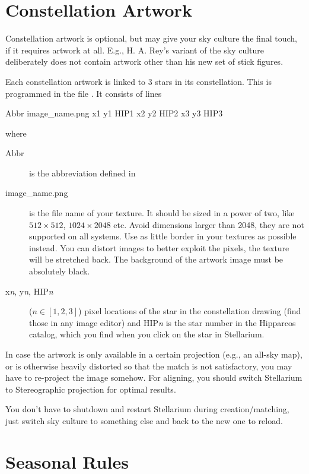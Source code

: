 \section{Constellation Artwork}
\label{sec:skycultures:artwork}

Constellation artwork is optional, but may give your sky culture the
final touch, if it requires artwork at all. E.g., H. A. Rey's variant
of the  sky culture deliberately does not contain artwork
other than his new set of stick figures.

Each constellation artwork is linked to 3 stars in its constellation. This
is programmed in the file . It consists of lines

\begin{configfile}
  Abbr image_name.png x1 y1 HIP1 x2 y2 HIP2 x3 y3 HIP3
\end{configfile}
where 
\begin{description}
\item[Abbr] is the abbreviation defined in 
\item[image\_name.png] is the file name of your texture. It should be
  sized in a power of two, like $512\times512$, $1024\times2048$
  etc. Avoid dimensions larger than 2048, they are not supported on
  all systems. Use as little border in your textures as possible instead.
  You can distort images to better exploit the pixels,
  the texture will be stretched back. The background of the artwork
  image must be absolutely black.
\item[x\textit{n}, y\textit{n}, HIP\textit{n}] ($n\in[1, 2, 3]$) pixel locations of the
  star in the constellation drawing (find those in any image editor)
  and HIP\textit{n} is the star number in the Hipparcos catalog, which
  you find when you click on the star in Stellarium.
\end{description}

In case the artwork is only available in a certain projection (e.g.,
an all-sky map), or is otherwise heavily distorted so that the match
is not satisfactory, you may have to re-project the image somehow. For
aligning, you should switch Stellarium to Stereographic projection for
optimal results.

You don't have to shutdown and restart Stellarium during
creation/matching, just switch sky culture to something else and back
to the new one to reload.

\section{Seasonal Rules}
\label{sec:skycultures:seasonal_rules}

